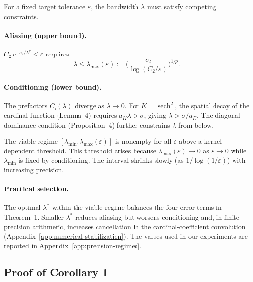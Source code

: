 \documentclass{article}
\begin{document}
For a fixed target tolerance \(\varepsilon\), the bandwidth \(\lambda\) must satisfy competing constraints.

\paragraph{Aliasing (upper bound).}
\(C_2\,e^{-c_2/\lambda^p}\le\varepsilon\) requires
\[
  \lambda \le \lambda_{\max}(\varepsilon) := \Big(\frac{c_2}{\log(C_2/\varepsilon)}\Big)^{1/p}.
\]

\paragraph{Conditioning (lower bound).}
The prefactors \(C_i(\lambda)\) diverge as \(\lambda\to 0\).  For \(K = \operatorname{sech}^2\), the spatial decay of the cardinal function (Lemma~4) requires \(a_K\lambda > \sigma\), giving \(\lambda > \sigma/a_K\).  The diagonal-dominance condition (Proposition~4) further constrains \(\lambda\) from below.

The viable regime \([\lambda_{\min},\lambda_{\max}(\varepsilon)]\) is nonempty for all \(\varepsilon\) above a kernel-dependent threshold.  This threshold arises because \(\lambda_{\max}(\varepsilon)\to 0\) as \(\varepsilon\to 0\) while \(\lambda_{\min}\) is fixed by conditioning.  The interval shrinks slowly (as \(1/\log(1/\varepsilon)\)) with increasing precision.

\paragraph{Practical selection.}
The optimal \(\lambda^*\) within the viable regime balances the four error terms in Theorem~1.  Smaller \(\lambda^*\) reduces aliasing but worsens conditioning and, in finite-precision arithmetic, increases cancellation in the cardinal-coefficient convolution (Appendix~\ref{app:numerical-stabilization}).  The values used in our experiments are reported in Appendix~\ref{app:precision-regimes}.

\subsection{Proof of Corollary 1}
\label{app:proof-cor1}
\end{document}
